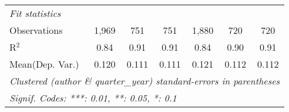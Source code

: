 \begin{tabular}{lcccccc}
   \midrule
   \emph{Fit statistics}\\
   Observations            & 1,969   & 751     & 751           & 1,880   & 720     & 720\\  
   R$^2$                   & 0.84    & 0.91    & 0.91          & 0.84    & 0.90    & 0.91\\  
Mean(Dep. Var.) & 0.120 & 0.111 & 0.111 & 0.121 & 0.112 & 0.112 \\
   \midrule \midrule
   \multicolumn{7}{l}{\emph{Clustered (author \& quarter\_year) standard-errors in parentheses}}\\
   \multicolumn{7}{l}{\emph{Signif. Codes: ***: 0.01, **: 0.05, *: 0.1}}\\
\end{tabular}
\par\endgroup
